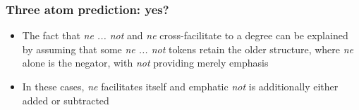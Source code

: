 \documentclass{digs-slides}
\begin{document}
\begin{frame}
    \frametitle{Three atom prediction: yes?}
    \begin{itemize}
      \item The fact that \emph{ne ... not} and \emph{ne}
        cross-facilitate to a degree can be explained by assuming that
        some \emph{ne ... not} tokens retain the older structure, where
        \emph{ne} alone is the negator, with \emph{not} providing merely
        emphasis
      \item In these cases, \emph{ne} facilitates itself and emphatic
        \emph{not} is additionally either added or subtracted
    \end{itemize}

    \begin{minipage}{0.75\linewidth}
        \small\centering
    \end{minipage}
\end{frame}
\end{document}
